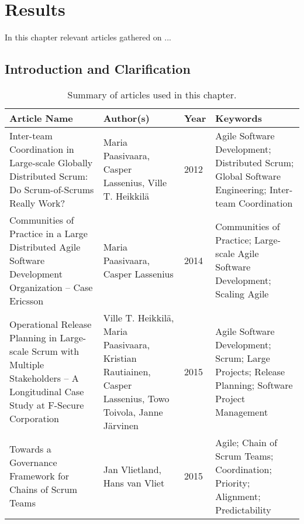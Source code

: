 \chapter{Results}
\label{results}

\minitoc

In this chapter relevant articles gathered on ...

\newpage

\section{Introduction and Clarification}

\begin{table}[H]
\begin{center}
    \begin{tabular}{| p{5cm} | p{3.7cm} | p{1cm} | p{4cm} |}
    \hline
    \textbf{Article Name} & \textbf{Author(s)} & \textbf{Year} & \textbf{Keywords} \\ \hline
    Inter-team Coordination in Large-scale Globally Distributed Scrum: Do Scrum-of-Scrums Really Work? & Maria Paasivaara, Casper Lassenius, Ville T. Heikkilä & 2012 & Agile Software Development; Distributed Scrum; Global Software Engineering; Inter-team Coordination \\ \hline
    Communities of Practice in a Large Distributed Agile Software Development Organization – Case Ericsson & Maria Paasivaara, Casper Lassenius & 2014 & Communities of Practice; Large-scale Agile Software Development; Scaling Agile \\ \hline
    Operational Release Planning in Large-scale Scrum with Multiple Stakeholders – A Longitudinal Case Study at F-Secure Corporation & Ville T. Heikkilä, Maria Paasivaara, Kristian Rautiainen, Casper Lassenius, Towo Toivola, Janne Järvinen & 2015 & Agile Software Development; Scrum; Large Projects; Release Planning; Software Project Management \\ \hline
Towards a Governance Framework for Chains of Scrum Teams & Jan Vlietland, Hans van Vliet & 2015 & Agile; Chain of Scrum Teams; Coordination; Priority; Alignment; Predictability \\ \hline
    \end{tabular}
    \caption{Summary of articles used in this chapter.}
    \label{soauitc}
\end{center}
\end{table}